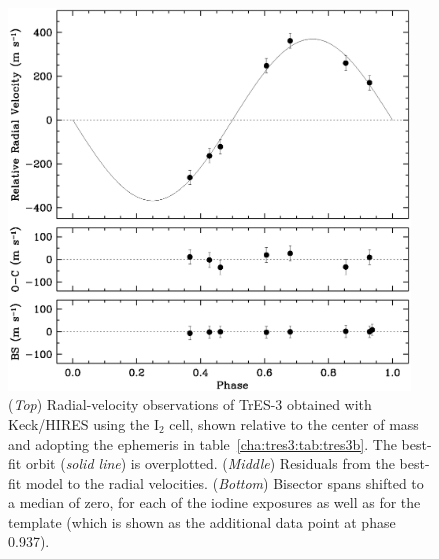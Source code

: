 \begin{figure}
\begin{center}
\includegraphics[width=0.95\textwidth]{5_f1}
\caption[%
Radial-velocity observations of TrES-3]{%
({\it Top}) Radial-velocity observations of TrES-3 obtained with Keck/HIRES using the
$\mathrm{I}_2$ cell, shown relative to the center of mass and adopting the ephemeris in table~\ref{cha:tres3:tab:tres3b}. 
The best-fit orbit ({\it solid line}) is overplotted.
({\it Middle}) Residuals from the best-fit model to the radial velocities.
({\it Bottom}) Bisector spans shifted to a median of zero, for each of the iodine exposures as well as for the template (which is shown as the additional data point at phase 0.937).%
}
\label{cha:tres3:fig:rvtres3}
\end{center}
\end{figure}

